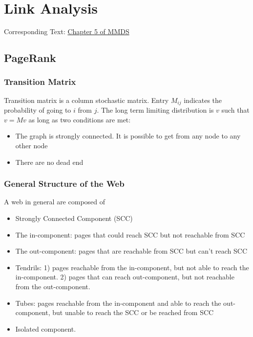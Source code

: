 \chapter{Link Analysis} 
Corresponding Text: \href{http://infolab.stanford.edu/~ullman/mmds/ch5.pdf}{Chapter 5 of MMDS}

\section{PageRank}
\subsection{Transition Matrix} 
Transition matrix is a column stochastic matrix. Entry $M_{ij}$ indicates the probability of going to $i$ from $j$. The long term limiting distribution is $v$ such that $v = Mv$ as long as two conditions are met: 
    \begin{itemize}
        \item The graph is strongly connected. It is possible to get from any node to any other node 
        \item There are no dead end
    \end{itemize}
    
\subsection{General Structure of the Web} 
A web in general are composed of 
    \begin{itemize}
        \item Strongly Connected Component (SCC) 
        \item The in-component: pages that could reach SCC but not reachable from SCC
        \item The out-component: pages that are reachable from SCC but can't reach SCC
        \item Tendrils: 1) pages reachable from the in-component, but not able to reach the in-component. 2) pages that can reach out-component, but not reachable from the out-component. 
        \item Tubes: pages reachable from the in-component and able to reach the out-component, but unable to reach the SCC or be reached from SCC
        \item Isolated component. 
    \end{itemize}
    
